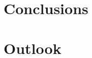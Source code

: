 \documentclass[pdflatex, sectionletters, 12pt]{pittetd}    %
\begin{document}
\chapter{Conclusions}


\chapter{Outlook}


%
\appendix                          %
%

% 

\end{document}
